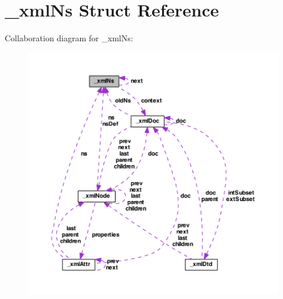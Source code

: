 \hypertarget{struct__xml_ns}{\section{\-\_\-xml\-Ns Struct Reference}
\label{struct__xml_ns}
}


Collaboration diagram for \-\_\-xml\-Ns\-:
\nopagebreak
\begin{figure}[H]
\begin{center}
\leavevmode
\includegraphics[width=350pt]{struct__xml_ns__coll__graph}
\end{center}
\end{figure}
